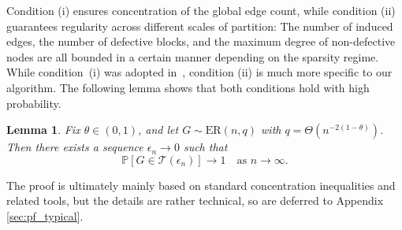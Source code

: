 \documentclass[journal]{IEEEtran}
\newcommand{\rEm}{\mathrm{E}_{\max}}
\newtheorem{lemma}{Lemma}
\theoremstyle{definition}
\theoremstyle{definition}
\newcommand{\Tc}{\mathcal{T}}
\newcommand{\PP}{\mathbb{P}}
\newcommand{\kb}{\overline{k}}
\DeclarePairedDelimiter\ceil{\lceil}{\rceil}
\begin{document}

Condition (i) ensures concentration of the global edge count, while condition (ii) guarantees regularity across different scales of partition: The number of induced edges, the number of defective blocks, and the maximum degree of non-defective nodes are all bounded in a certain manner depending on the sparsity regime.  
While condition~(i) was adopted in~\cite{li2019learning}, condition (ii) is much more specific to our algorithm.  The following lemma shows that both conditions hold with high probability.

\begin{lemma} \label{lem:typical}
Fix \( \theta \in (0,1) \), and let \( G \sim \mathrm{ER}(n, q) \) with \( q = \Theta(n^{-2(1-\theta)}) \).  
Then there exists a sequence \( \epsilon_n \to 0 \) such that
\[
  \PP[G \in \Tc(\epsilon_n)] \to 1 \quad \text{as } n \to \infty.
\]
\end{lemma}

The proof is ultimately mainly based on standard concentration inequalities and related tools, but the details are rather technical, so are deferred to Appendix \ref{sec:pf_typical}.
\end{document}
